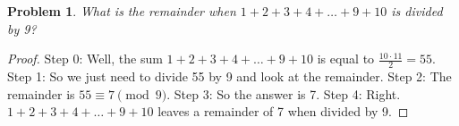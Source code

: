 \documentclass{article}
\newtheorem{theorem}{Problem}
\begin{document}
\begin{theorem}
What is the remainder when $1 + 2 + 3 + 4 + \dots + 9 + 10$ is divided by 9?
\end{theorem}

\begin{proof}
Step 0: Well, the sum $1 + 2 + 3 + 4 + \dots + 9 + 10$ is equal to $\frac{10 \cdot 11}{2} = 55$.
Step 1: So we just need to divide 55 by 9 and look at the remainder.
Step 2: The remainder is $55 \equiv 7 \pmod{9}$.
Step 3: So the answer is 7.
Step 4: Right. $1 + 2 + 3 + 4 + \dots + 9 + 10$ leaves a remainder of 7 when divided by 9.
\end{proof}
\end{document}
